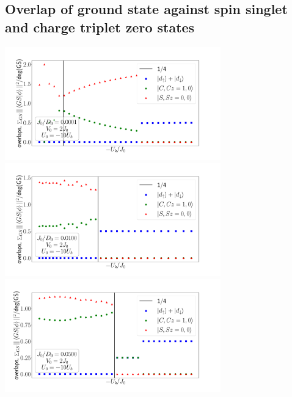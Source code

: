 \documentclass{report}
\numberwithin{equation}{section}
\begin{document}
\subsection*{Overlap of ground state against spin singlet and charge triplet zero states}
\begin{center}
	\includegraphics[width=0.7\textwidth]{../figures/overlaps_gs-J=0.100.pdf}\\
	\includegraphics[width=0.7\textwidth]{../figures/overlaps_gs-J=10.000.pdf}\\
	\includegraphics[width=0.7\textwidth]{../figures/overlaps_gs-J=50.000.pdf}
\end{center}
\end{document}
